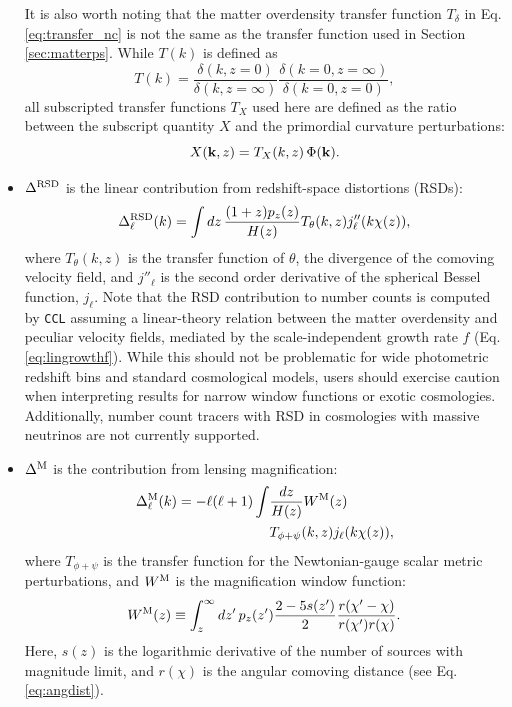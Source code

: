 \documentclass[\docopts]{\docclass}
\newcommand{\ccl}{{\tt CCL}\xspace}
\begin{document}
\begin{itemize}
        It is also worth noting that the matter overdensity transfer function $T_\delta$ in Eq. \ref{eq:transfer_nc} is not the same as the transfer function used in Section \ref{sec:matterps}. While $T(k)$ is defined as \citep{1998ApJ...496..605E} 
        \begin{equation}
          T(k)=\frac{\delta(k,z=0)}{\delta(k,z=\infty)}\frac{\delta(k=0,z=\infty)}{\delta(k=0,z=0)},
        \end{equation}
        all subscripted transfer functions $T_X$ used here are defined as the ratio between the subscript quantity $X$ and the primordial curvature perturbations:
        \begin{equation}
          X({\bf k},z)=T_X(k,z)\,\Phi({\bf k}).
        \end{equation}        
  \item $\Delta^{\rm RSD}$ is the linear contribution from redshift-space distortions (RSDs):
        \begin{equation}\label{eq:transfer_rsd}
          \Delta^{\rm RSD}_\ell(k)=\int dz\,\frac{(1+z) p_z(z)}{H(z)}T_\theta(k,z) j_\ell''(k\chi(z)),
        \end{equation}
        where $T_\theta(k,z)$ is the transfer function of $\theta$, the divergence of the comoving velocity field, and $j''_\ell$ is the second order derivative of the spherical Bessel function, $j_\ell$. Note that the RSD contribution to number counts is computed by \ccl assuming a linear-theory relation between the matter overdensity and peculiar velocity fields, mediated by the scale-independent growth rate $f$ (Eq. \ref{eq:lingrowthf}). While this should not be problematic for wide photometric redshift bins and standard cosmological models, users should exercise caution when interpreting results for narrow window functions or exotic cosmologies. Additionally, number count tracers with RSD in cosmologies with massive neutrinos are not currently supported.
  \item $\Delta^{\rm M}$ is the contribution from lensing magnification:
        \begin{align}\nonumber
          \Delta_\ell^{\rm M}(k)=-\ell(\ell+1)\int & \frac{dz}{H(z)} W^{\rm M}(z) \\\label{eq:deltaM}
          &T_{\phi+\psi}(k,z) j_\ell(k\chi(z)),
        \end{align}
        where $T_{\phi+\psi}$ is the transfer function for the Newtonian-gauge scalar metric perturbations, and $W^{\rm M}$ is the magnification window function:
        \begin{equation}\label{eq:window_mag}
          W^{\rm M}(z)\equiv\int_z^\infty dz'\,p_z(z')\frac{2-5s(z')}{2}\frac{r(\chi'-\chi)}{r(\chi')r(\chi)}.
        \end{equation}
        Here, $s(z)$ is the logarithmic derivative of the number of sources with magnitude limit, and $r(\chi)$ is the angular comoving distance (see Eq. \ref{eq:angdist}).
\end{itemize}
\end{document}
